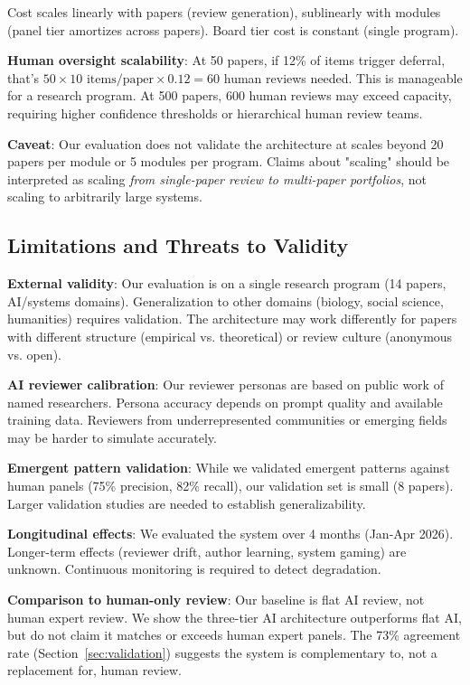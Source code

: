 Cost scales linearly with papers (review generation), sublinearly with modules (panel tier amortizes across papers). Board tier cost is constant (single program).

\textbf{Human oversight scalability}: At 50 papers, if 12\% of items trigger deferral, that's $50 \times 10 \text{ items/paper} \times 0.12 = 60$ human reviews needed. This is manageable for a research program. At 500 papers, 600 human reviews may exceed capacity, requiring higher confidence thresholds or hierarchical human review teams.

\textbf{Caveat}: Our evaluation does not validate the architecture at scales beyond 20 papers per module or 5 modules per program. Claims about "scaling" should be interpreted as scaling \emph{from single-paper review to multi-paper portfolios}, not scaling to arbitrarily large systems.

\subsection{Limitations and Threats to Validity}

\textbf{External validity}: Our evaluation is on a single research program (14 papers, AI/systems domains). Generalization to other domains (biology, social science, humanities) requires validation. The architecture may work differently for papers with different structure (empirical vs. theoretical) or review culture (anonymous vs. open).

\textbf{AI reviewer calibration}: Our reviewer personas are based on public work of named researchers. Persona accuracy depends on prompt quality and available training data. Reviewers from underrepresented communities or emerging fields may be harder to simulate accurately.

\textbf{Emergent pattern validation}: While we validated emergent patterns against human panels (75\% precision, 82\% recall), our validation set is small (8 papers). Larger validation studies are needed to establish generalizability.

\textbf{Longitudinal effects}: We evaluated the system over 4 months (Jan-Apr 2026). Longer-term effects (reviewer drift, author learning, system gaming) are unknown. Continuous monitoring is required to detect degradation.

\textbf{Comparison to human-only review}: Our baseline is flat AI review, not human expert review. We show the three-tier AI architecture outperforms flat AI, but do not claim it matches or exceeds human expert panels. The 73\% agreement rate (Section~\ref{sec:validation}) suggests the system is complementary to, not a replacement for, human review.